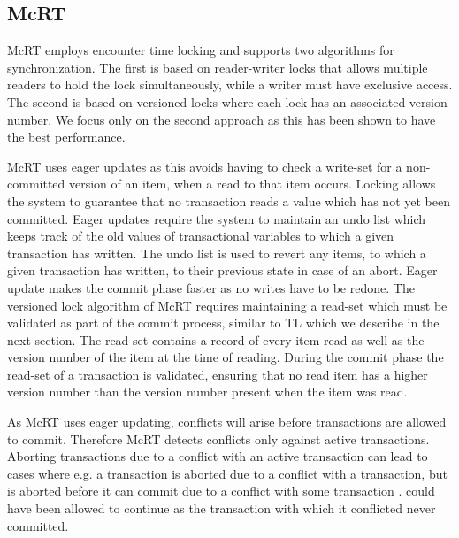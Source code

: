 \subsection{McRT}
\label{sec:stm_impl_mcrt}
McRT employs encounter time locking and supports two algorithms for synchronization\cite[p. 189]{saha2006mcrt}. The first is based on reader-writer locks that allows multiple readers to hold the lock simultaneously, while a writer must have exclusive access\cite[p. 189]{saha2006mcrt}. The second is based on versioned locks where each lock has an associated version number\cite[p. 108]{harris2010transactional}. We focus only on the second approach as this has been shown to have the best performance\cite[p. 190]{saha2006mcrt}. 

McRT uses eager updates as this avoids having to check a write-set for a non-committed version of an item, when a read to that item occurs\cite[p. 109]{harris2010transactional}. Locking allows the system to guarantee that no transaction reads a value which has not yet been committed\cite[p. 108]{harris2010transactional}. Eager updates require the system to maintain an undo list which keeps track of the old values of transactional variables to which a given transaction has written. The undo list is used to revert any items, to which a given transaction has written, to their previous state in case of an abort\cite[p. 189]{saha2006mcrt}. Eager update makes the commit phase faster as no writes have to be redone\cite[p. 190]{saha2006mcrt}. The versioned lock algorithm of McRT requires maintaining a read-set which must be validated as part of the commit process, similar to TL which we describe in the next section. The read-set contains a record of every item read as well as the version number of the item at the time of reading. During the commit phase the read-set of a transaction is validated, ensuring that no read item has a higher version number than the version number present when the item was read\cite[p. 190]{saha2006mcrt}.

As McRT uses eager updating, conflicts will arise before transactions are allowed to commit. Therefore McRT detects conflicts only against active transactions\cite[p. 189]{saha2006mcrt}. Aborting transactions due to a conflict with an active transaction can lead to cases where e.g. a transaction  is aborted due to a conflict with a  transaction, but  is aborted before it can commit due to a conflict with some transaction \cite[p. 2084]{herlihy2011tm}.  could have been allowed to continue as the transaction with which it conflicted never committed. 

